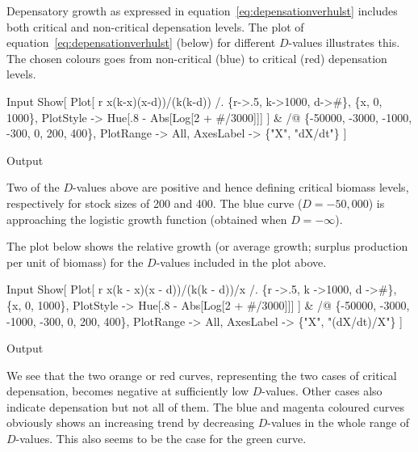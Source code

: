 \documentclass[11pt,fleqn]{book} %
\begin{document}
\begin{theorem}
\hfill \break
Depensatory growth as expressed in equation~\ref{eq:depensationverhulst} includes both critical and non-critical depensation levels. The plot of equation~\ref{eq:depensationverhulst} (below) for different $D$-values illustrates this. The chosen colours goes from non-critical (blue) to critical (red) depensation levels.
\begin{mmaCell}[index=1]{Input}
  Show[
    Plot[
      r x(k-x)(x-d))/(k(k-d)) /. \{r->.5, k->1000, d->#\},
      \{x, 0, 1000\},
      PlotStyle -> Hue[.8 - Abs[Log[2 + #/3000]]]
    ] & /@ \{-50000, -3000, -1000, -300, 0, 200, 400\}, 
    PlotRange -> All,
    AxesLabel -> \{"X", "dX/dt"\}
  ]
\end{mmaCell}
\begin{mmaCell}[moregraphics={moreig={scale=.7}}]{Output}
\end{mmaCell}
Two of the $D$-values above are positive and hence defining critical biomass levels, respectively for stock sizes of 200 and 400. The blue curve ($D = -50,000$) is approaching the logistic growth function (obtained when $D = -\infty$).

The plot below shows the relative growth (or average growth; surplus production per unit of biomass) for the $D$-values included in the plot above.
\begin{mmaCell}[index=1]{Input}
  Show[
    Plot[
      r x(k - x)(x - d))/(k(k - d))/x /. \{r ->.5, k ->1000, d ->#\},
      \{x, 0, 1000\}, 
      PlotStyle -> Hue[.8 - Abs[Log[2 + #/3000]]]
    ] & /@ \{-50000, -3000, -1000, -300, 0, 200, 400\}, 
    PlotRange -> All, 
    AxesLabel -> \{"X", "(dX/dt)/X"\}
  ]
\end{mmaCell}
\begin{mmaCell}[moregraphics={moreig={scale=.7}}]{Output}
\end{mmaCell}
We see that the two orange or red curves, representing the two cases of critical depensation, becomes negative at sufficiently low $D$-values. Other cases also indicate depensation but not all of them. The blue and magenta coloured curves obviously shows an increasing trend by decreasing $D$-values in the whole range of $D$-values. This also seems to be the case for the green curve.  


\end{theorem}
\end{document}
